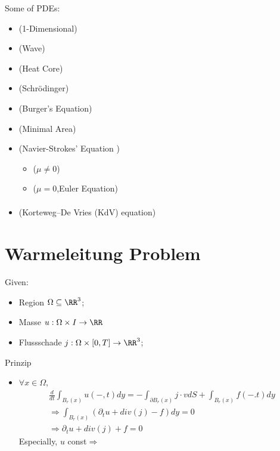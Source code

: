 \documentclass[Total.tex]{subfiles}
\begin{document}
			
		Some of PDEs:
		\begin{itemize}
			\item (1-Dimensional)
			\item (Wave)
			 \item (Heat Core)
			\item (Schr\"odinger)
			\item (Burger's Equation)
			\item (Minimal Area)
			\item (Navier-Strokes' Equation )
			\begin{itemize}
				\item ($\mu\not=0$)
				\item ($\mu=0$,Euler Equation) 
				\begin{gather*}
				\end{gather*}
			\end{itemize}
			\item (Korteweg–De Vries (KdV) equation)
		\end{itemize}
		\section{Warmeleitung Problem}
			Given:
			\begin{itemize}
				\item Region $\Omega\subseteq \RR^3$;
				\item Masse $u:\Omega\times I\rightarrow \RR$
				\item Flussschade $j:\Omega\times [0,T]\rightarrow \RR^3$;
			\end{itemize}
			Prinzip
			\begin{itemize}
				\item $\forall x\in \Omega,$
				\begin{gather*}
					\frac{d}{dt}\int_{B_r(x)} u(-,t)dy=-\int_{\partial B_r(x)} j\cdot v dS+\int_{B_r(x)} f(-.t)dy\\
					\Rightarrow \int_{B_r(x)} (\partial_t u+div (j)-f)dy=0\\
					\Rightarrow \partial_t u+div(j)+f=0
				\end{gather*}
				Especially, $u$ const$\Rightarrow $ 
			\end{itemize}
\end{document}
